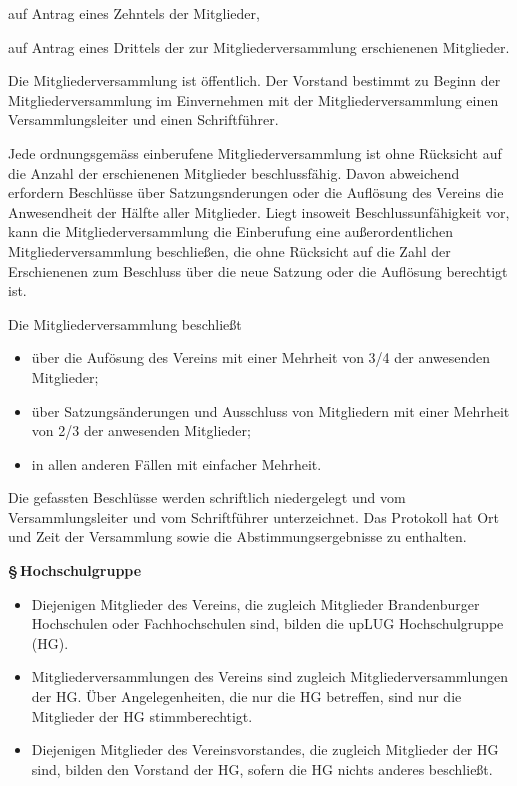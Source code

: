 \documentclass[11pt]{article}
\def\items#1{{%
  \itcounter0%
  \begin{itemize}
  #1
  \end{itemize}
}}
\let\it\item%
\def\item{
  \advance\itcounter1%
  \it[(\the\itcounter)]
}
\def\paragraf#1{
  \advance\itcounter1%
  \par\medskip
  {\large\bfseries \S\,\the\itcounter\quad#1}
  \par\smallskip
}
\begin{document}
{{        \item auf Antrag eines Zehntels der Mitglieder,
        \item auf Antrag eines Drittels der zur Mitgliederversammlung erschienenen Mitglieder.
       }
   \item
       Die Mitgliederversammlung ist {\"o}ffentlich. Der Vorstand bestimmt zu Beginn der Mitglieder\-ver\-sammlung
       im Einvernehmen mit der Mitgliederversammlung einen Versammlungsleiter und einen Schriftf{\"u}hrer.
   \item 
         Jede ordnungsgem{\"a}ss einberufene Mitgliederversammlung ist ohne R{\"u}cksicht auf
         die Anzahl der erschienenen Mitglieder beschlussf{\"a}hig.
         Davon abweichend erfordern Beschl{\"u}sse {\"u}ber Satzungsnderungen oder
         die Aufl{\"o}sung des Vereins die
         Anwesendheit der H{\"a}lfte aller Mitglieder. Liegt insoweit Beschlussunf{\"a}higkeit
         vor, kann die Mitgliederversammlung die Einberufung eine au{\ss}erordentlichen
         Mitgliederversammlung beschlie{\ss}en, die ohne R{\"u}cksicht auf die Zahl der Erschienenen zum
         Beschluss {\"u}ber die neue Satzung oder die Aufl{\"o}sung berechtigt ist.
   \item
     Die Mitgliederversammlung beschlie{\ss}t
     \items{
       \item {\"u}ber die Auf{\"o}sung des Vereins mit  einer Mehrheit von 3/4 der anwesenden Mitglieder;
       \item {\"u}ber Satzungs{\"a}nderungen und Ausschluss von Mitgliedern mit einer Mehrheit von
                2/3 der anwesenden Mitglieder;
       \item in allen anderen F{\"a}llen mit einfacher Mehrheit.
     }
   \item Die gefassten Beschl{\"u}sse werden schriftlich niedergelegt und vom
        Versammlungsleiter und vom Schriftf{\"u}hrer unterzeichnet. Das Protokoll hat
        Ort und Zeit der Versammlung sowie die Abstimmungsergebnisse zu
        enthalten.
}



\paragraf{Hochschulgruppe}

\items{
  \item
    Diejenigen Mitglieder des Vereins, die zugleich Mitglieder Brandenburger Hochschulen oder
    Fachhochschulen sind, bilden die \glqq upLUG Hochschulgruppe\grqq{} (HG).
  \item
    Mitgliederversammlungen des Vereins sind zugleich Mitgliederversammlungen der HG.
    {\"U}ber Angelegenheiten, die nur die HG betreffen, sind nur die Mitglieder der HG
    stimmberechtigt.
  \item
    Diejenigen Mitglieder des Vereinsvorstandes, die zugleich
    Mitglieder der HG sind, bilden den Vorstand der HG, sofern die HG nichts anderes beschlie{\ss}t.
}
\end{document}
